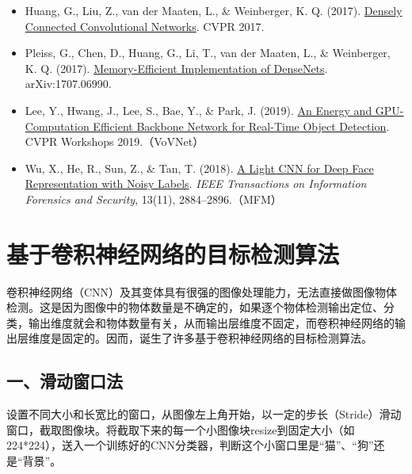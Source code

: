 \vspace{0.25em}
\begin{itemize}
\tightlist
\item
  Huang, G., Liu, Z., van der Maaten, L., \& Weinberger, K. Q. (2017). \href{https://arxiv.org/abs/1608.06993}{Densely Connected Convolutional Networks}. CVPR 2017.
\item
  Pleiss, G., Chen, D., Huang, G., Li, T., van der Maaten, L., \& Weinberger, K. Q. (2017). \href{https://arxiv.org/abs/1707.06990}{Memory-Efficient Implementation of DenseNets}. arXiv:1707.06990.
\item
  Lee, Y., Hwang, J., Lee, S., Bae, Y., \& Park, J. (2019). \href{https://openaccess.thecvf.com/content_CVPRW_2019/html/CEFRL/Lee_An_Energy_and_GPU-Computation_Efficient_Backbone_Network_for_Real-Time_Object_CVPRW_2019_paper.html}{An Energy and GPU-Computation Efficient Backbone Network for Real-Time Object Detection}. CVPR Workshops 2019.（VoVNet）
\item
  Wu, X., He, R., Sun, Z., \& Tan, T. (2018). \href{https://arxiv.org/abs/1511.02683}{A Light CNN for Deep Face Representation with Noisy Labels}. \emph{IEEE Transactions on Information Forensics and Security}, 13(11), 2884--2896.（MFM）
\end{itemize}

\clearpage

\hypertarget{ux57faux4e8eux5377ux79efux795eux7ecfux7f51ux7edcux7684ux76eeux6807ux68c0ux6d4bux7b97ux6cd5}{%
\section{基于卷积神经网络的目标检测算法}\label{ux57faux4e8eux5377ux79efux795eux7ecfux7f51ux7edcux7684ux76eeux6807ux68c0ux6d4bux7b97ux6cd5}}

卷积神经网络（CNN）及其变体具有很强的图像处理能力，无法直接做图像物体检测。这是因为图像中的物体数量是不确定的，如果逐个物体检测输出定位、分类，输出维度就会和物体数量有关，从而输出层维度不固定，而卷积神经网络的输出层维度是固定的。因而，诞生了许多基于卷积神经网络的目标检测算法。

\hypertarget{ux4e00ux6ed1ux52a8ux7a97ux53e3ux6cd5}{%
\subsection{一、滑动窗口法}\label{ux4e00ux6ed1ux52a8ux7a97ux53e3ux6cd5}}

设置不同大小和长宽比的窗口，从图像左上角开始，以一定的步长（Stride）滑动窗口，截取图像块。将截取下来的每一个小图像块resize到固定大小（如224*224），送入一个训练好的CNN分类器，判断这个小窗口里是``猫''、``狗''还是``背景''。

